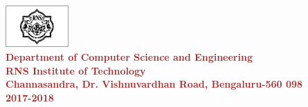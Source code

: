 \begin{titlepage}
\begin{center}
\includegraphics[width=0.18\textwidth]{./rnsit.jpg}\\[0.1in]

\textup{\normalsize {\textcolor{brown}{\bf Department of Computer Science and Engineering} \\ {\textcolor{brown}{\bf \bf{RNS Institute of Technology}}}}}\\
\textup{\small {\textcolor{brown}{\bf Channasandra, Dr. Vishnuvardhan Road, Bengaluru-560 098}\\ \textbf {\textcolor{brown}{2017-2018}}}}




\end{center}
\end{titlepage}
